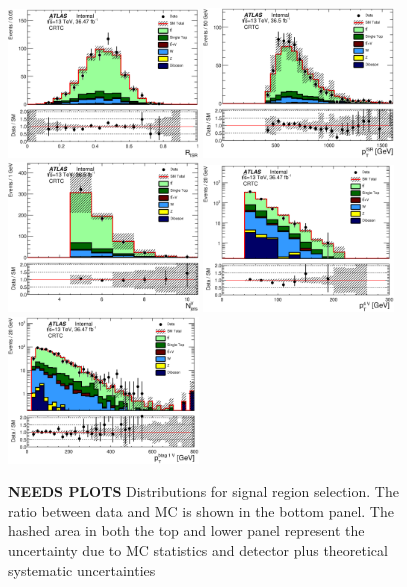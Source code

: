 \begin{figure}[htbp]
  \begin{center}
    \includegraphics[width=0.45\textwidth]{figures/ttbar/postfit/CA_RISR_CRTopC}
    \includegraphics[width=0.45\textwidth]{figures/ttbar/postfit/CA_pTISR_CRTopC}
    \includegraphics[width=0.45\textwidth]{figures/ttbar/postfit/CA_NjV_CRTopC}
    \includegraphics[width=0.45\textwidth]{figures/ttbar/postfit/CA_pTjV4_CRTopC_log}
    \includegraphics[width=0.45\textwidth]{figures/ttbar/postfit/CA_pTbV1_CRTopC_log}
  \end{center}
  \caption{{\bf NEEDS PLOTS} Distributions for signal region selection. The ratio between data and MC is shown in the bottom panel. The hashed area in both the top and lower panel represent the uncertainty due to MC statistics and detector plus theoretical systematic uncertainties}
  \label{fig:SR}
\end{figure}

